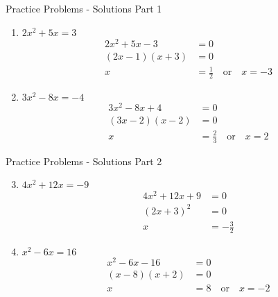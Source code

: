 \documentclass[aspectratio=169]{beamer}
\begin{document}
\begin{frame}{Practice Problems - Solutions Part 1}
    \begin{tcolorbox}[colback=lightgray,colframe=accent,title=Detailed Solutions]
        \footnotesize
        \begin{enumerate}
            \setlength{\itemsep}{0.5em}
            \item $2x^2 + 5x = 3$
            \begin{align*}
                2x^2 + 5x - 3 &= 0 \\
                (2x - 1)(x + 3) &= 0 \\
                x &= \frac{1}{2} \quad \text{or} \quad x = -3
            \end{align*}
            
            \item $3x^2 - 8x = -4$
            \begin{align*}
                3x^2 - 8x + 4 &= 0 \\
                (3x - 2)(x - 2) &= 0 \\
                x &= \frac{2}{3} \quad \text{or} \quad x = 2
            \end{align*}
        \end{enumerate}
    \end{tcolorbox}
\end{frame}

\begin{frame}{Practice Problems - Solutions Part 2}
    \begin{tcolorbox}[colback=lightgray,colframe=accent,title=Detailed Solutions]
        \footnotesize
        \begin{enumerate}
            \setcounter{enumi}{2}
            \setlength{\itemsep}{0.5em}
            \item $4x^2 + 12x = -9$
            \begin{align*}
                4x^2 + 12x + 9 &= 0 \\
                (2x + 3)^2 &= 0 \\
                x &= -\frac{3}{2}
            \end{align*}
            
            \item $x^2 - 6x = 16$
            \begin{align*}
                x^2 - 6x - 16 &= 0 \\
                (x - 8)(x + 2) &= 0 \\
                x &= 8 \quad \text{or} \quad x = -2
            \end{align*}
        \end{enumerate}
    \end{tcolorbox}
\end{frame}
\end{document}
